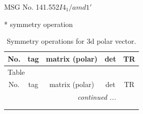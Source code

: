 \documentclass[fleqn,8pt]{jsarticle}
\begin{document}
\setcounter{MaxMatrixCols}{32}

\renewcommand{\tablename}{Table~}
\renewcommand{\figurename}{Figure~}
\begin{center}
\LARGE
MSG No. 141.552\quad$I4_{1}/amd1'$
\end{center}
* symmetry operation
\renewcommand{\arraystretch}{1.3}
\begin{longtable}{ccccc}
\caption{Symmetry operations for 3d polar vector.}
 \\
 \hline \hline
No. & tag & matrix (polar) & det & TR \\ \hline \endfirsthead

\multicolumn{4}{l}{\tablename\ \thetable{}} \\
 \hline \hline
No. & tag & matrix (polar) & det & TR \\ \hline \endhead

 \hline \hline
\multicolumn{4}{r}{\footnotesize\it continued ...} \\ \endfoot

 \hline \hline
\multicolumn{4}{r}{} \\ \endlastfoot


\end{longtable}
\end{document}
